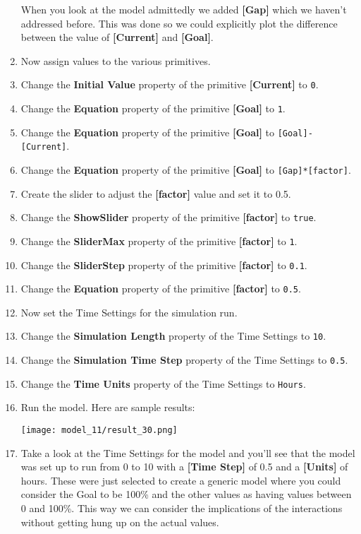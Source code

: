 \documentclass[]{memoir}
\makeatletter
\def\maxwidth{\ifdim\Gin@nat@width>\linewidth\linewidth
\else\Gin@nat@width\fi}
\let\Oldincludegraphics\includegraphics
\renewcommand{\includegraphics}[1]{\Oldincludegraphics[width=\maxwidth]{#1}}
\newcommand{\p}[1]{\textbf{{[}#1{]}}}
\newcommand{\e}[1]{\texttt{#1}}
\renewcommand{\a}[1]{\textbf{#1}}
\makeatother
\begin{document}
\begin{oframed}
\begin{enumerate}
When you look at the model admittedly we added \p{Gap} which we haven't addressed before. This was done so we could explicitly plot the difference between the value of \p{Current} and \p{Goal}.


\item 

Now assign values to the various primitives.


\item  Change the \a{Initial Value} property of the primitive \p{Current} to \e{0}.
\item  Change the \a{Equation} property of the primitive \p{Goal} to \e{1}.
\item  Change the \a{Equation} property of the primitive \p{Goal} to \e{[Goal]-[Current]}.
\item  Change the \a{Equation} property of the primitive \p{Goal} to \e{[Gap]*[factor]}.
\item 

Create the slider to adjust the \p{factor} value and set it to 0.5.


\item  Change the \a{ShowSlider} property of the primitive \p{factor} to \e{true}.
\item  Change the \a{SliderMax} property of the primitive \p{factor} to \e{1}.
\item  Change the \a{SliderStep} property of the primitive \p{factor} to \e{0.1}.
\item  Change the \a{Equation} property of the primitive \p{factor} to \e{0.5}.
\item 

Now set the Time Settings for the simulation run.


\item  Change the \a{Simulation Length} property of the Time Settings to \e{10}.
\item  Change the \a{Simulation Time Step} property of the Time Settings to \e{0.5}.
\item  Change the \a{Time Units} property of the Time Settings to \e{Hours}.
\item Run the model. Here are sample results:\par \begin{minipage}{\linewidth}  \centering \texttt{[image: model\_11/result\_30.png]}
\end{minipage}
\item 

Take a look at the Time Settings for the model and you'll see that the model was set up to run from 0 to 10 with a \p{Time Step} of 0.5 and a \p{Units} of hours. These were just selected to create a generic model where you could consider the Goal to be 100\% and the other values as having values between 0 and 100\%. This way we can consider the implications of the interactions without getting hung up on the actual values.



\end{enumerate}
\end{oframed}
\end{document}
